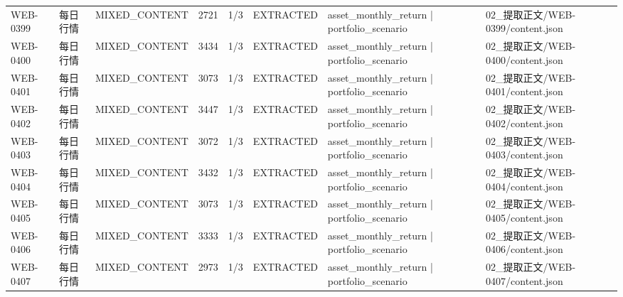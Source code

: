 \begin{landscape}
\begin{longtable}{p{1.8cm}p{4.2cm}p{3.0cm}p{1.4cm}p{1.6cm}p{2.4cm}p{4.2cm}p{4.2cm}}
WEB-0399 & 每日行情 & MIXED\_\allowbreak{}CONTENT & 2721 & 1/\allowbreak{}3 & EXTRACTED & asset\_\allowbreak{}monthly\_\allowbreak{}return | portfolio\_\allowbreak{}scenario & 02\_\allowbreak{}提取正文/\allowbreak{}WEB-0399/\allowbreak{}content.json\\
WEB-0400 & 每日行情 & MIXED\_\allowbreak{}CONTENT & 3434 & 1/\allowbreak{}3 & EXTRACTED & asset\_\allowbreak{}monthly\_\allowbreak{}return | portfolio\_\allowbreak{}scenario & 02\_\allowbreak{}提取正文/\allowbreak{}WEB-0400/\allowbreak{}content.json\\
WEB-0401 & 每日行情 & MIXED\_\allowbreak{}CONTENT & 3073 & 1/\allowbreak{}3 & EXTRACTED & asset\_\allowbreak{}monthly\_\allowbreak{}return | portfolio\_\allowbreak{}scenario & 02\_\allowbreak{}提取正文/\allowbreak{}WEB-0401/\allowbreak{}content.json\\
WEB-0402 & 每日行情 & MIXED\_\allowbreak{}CONTENT & 3447 & 1/\allowbreak{}3 & EXTRACTED & asset\_\allowbreak{}monthly\_\allowbreak{}return | portfolio\_\allowbreak{}scenario & 02\_\allowbreak{}提取正文/\allowbreak{}WEB-0402/\allowbreak{}content.json\\
WEB-0403 & 每日行情 & MIXED\_\allowbreak{}CONTENT & 3072 & 1/\allowbreak{}3 & EXTRACTED & asset\_\allowbreak{}monthly\_\allowbreak{}return | portfolio\_\allowbreak{}scenario & 02\_\allowbreak{}提取正文/\allowbreak{}WEB-0403/\allowbreak{}content.json\\
WEB-0404 & 每日行情 & MIXED\_\allowbreak{}CONTENT & 3432 & 1/\allowbreak{}3 & EXTRACTED & asset\_\allowbreak{}monthly\_\allowbreak{}return | portfolio\_\allowbreak{}scenario & 02\_\allowbreak{}提取正文/\allowbreak{}WEB-0404/\allowbreak{}content.json\\
WEB-0405 & 每日行情 & MIXED\_\allowbreak{}CONTENT & 3073 & 1/\allowbreak{}3 & EXTRACTED & asset\_\allowbreak{}monthly\_\allowbreak{}return | portfolio\_\allowbreak{}scenario & 02\_\allowbreak{}提取正文/\allowbreak{}WEB-0405/\allowbreak{}content.json\\
WEB-0406 & 每日行情 & MIXED\_\allowbreak{}CONTENT & 3333 & 1/\allowbreak{}3 & EXTRACTED & asset\_\allowbreak{}monthly\_\allowbreak{}return | portfolio\_\allowbreak{}scenario & 02\_\allowbreak{}提取正文/\allowbreak{}WEB-0406/\allowbreak{}content.json\\
WEB-0407 & 每日行情 & MIXED\_\allowbreak{}CONTENT & 2973 & 1/\allowbreak{}3 & EXTRACTED & asset\_\allowbreak{}monthly\_\allowbreak{}return | portfolio\_\allowbreak{}scenario & 02\_\allowbreak{}提取正文/\allowbreak{}WEB-0407/\allowbreak{}content.json\\

\end{longtable}
\end{landscape}
